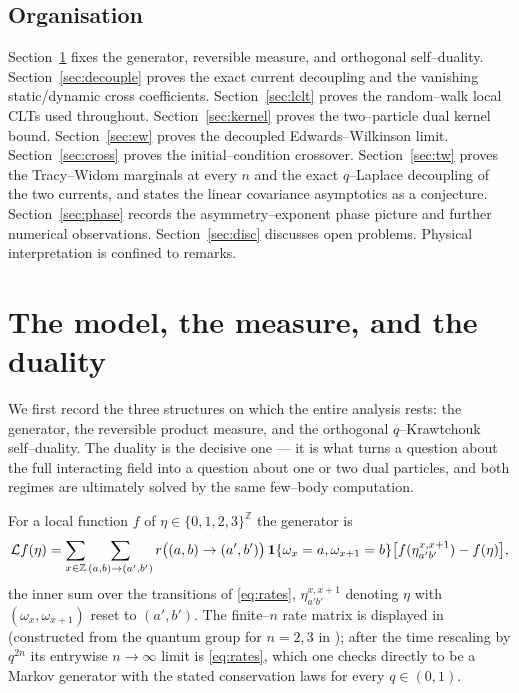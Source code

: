 \documentclass[11pt]{article}
\theoremstyle{plain}
\theoremstyle{definition}
\theoremstyle{remark}
\newcommand{\Z}{\mathbb{Z}}\newcommand{\R}{\mathbb{R}}\newcommand{\N}{\mathbb{N}}
\newcommand{\cL}{\mathcal L}\newcommand{\cO}{\mathcal O}\newcommand{\cE}{\mathcal E}
\begin{document}
\subsection{Organisation}\label{sec:introorg}
Section~\ref{sec:model} fixes the generator, reversible measure, and orthogonal
self--duality. Section~\ref{sec:decouple} proves the exact current decoupling and the
vanishing static/dynamic cross coefficients. Section~\ref{sec:lclt} proves the
random--walk local CLTs used throughout. Section~\ref{sec:kernel} proves the
two--particle dual kernel bound. Section~\ref{sec:ew} proves the decoupled
Edwards--Wilkinson limit. Section~\ref{sec:cross} proves the initial--condition
crossover. Section~\ref{sec:tw} proves the Tracy--Widom marginals at every $n$ and
the exact $q$--Laplace decoupling of the two currents, and states the linear
covariance asymptotics as a conjecture. Section~\ref{sec:phase} records the
asymmetry--exponent phase picture and further numerical observations.
Section~\ref{sec:disc} discusses open problems. Physical interpretation is confined to
remarks.

\section{The model, the measure, and the duality}\label{sec:model}

We first record the three structures on which the entire analysis rests: the generator,
the reversible product measure, and the orthogonal $q$--Krawtchouk self--duality. The
duality is the decisive one --- it is what turns a question about the full interacting
field into a question about one or two dual particles, and both regimes are ultimately
solved by the same few--body computation.

For a local function $f$ of $\eta\in\{0,1,2,3\}^\Z$ the generator is
\begin{equation}\label{eq:gen}
  \cL f(\eta)=\sum_{x\in\Z}\sum_{(a,b)\to(a',b')}
   r\big((a,b)\to(a',b')\big)\,\bone\{\omega_x=a,\omega_{x+1}=b\}
   \big[f(\eta^{x,x+1}_{a'b'})-f(\eta)\big],
\end{equation}
the inner sum over the transitions of \eqref{eq:rates}, $\eta^{x,x+1}_{a'b'}$ denoting
$\eta$ with $(\omega_x,\omega_{x+1})$ reset to $(a',b')$. The finite--$n$ rate matrix
is displayed in \cite[\S2.1]{REU} (constructed from the quantum group for $n=2,3$ in
\cite{KLLPZ}); after the time rescaling by $q^{2n}$ its entrywise $n\to\infty$ limit
is \eqref{eq:rates}, which one checks directly to be a Markov generator with the
stated conservation laws for every $q\in(0,1)$.
\end{document}
